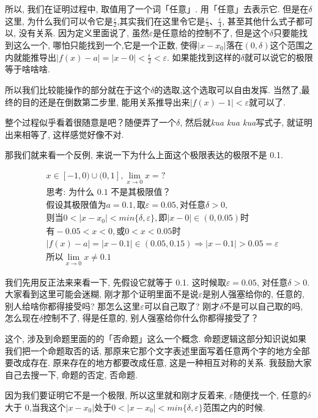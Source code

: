 所以, 我们在证明过程中, 取值用了一个词「任意」.  用「任意」去表示它. 但是在$\delta$这里, 为什么我们可以令它是$\frac{\varepsilon}{2}$,其实我们在这里令它是$\frac{\varepsilon}{3}$、$\frac{\varepsilon}{4}$, 甚至其他什么式子都可以, 没有关系. 因为定义里面说了, 虽然$\varepsilon$是任意给的控制不了, 但是这个$\delta$只要能找到这么一个, 哪怕只能找到一个,它是一个正数, 使得$|x-x_0|$落在$(0,\delta)$这个范围之内就能推导出$|f(x) - a| = |x - 0| < \frac{\varepsilon}{2} < \varepsilon$. 如果能找到这样的$\delta$就可以说它的极限等于啥啥啥. 

所以我们比较能操作的部分就在于这个$\delta$的选取,这个选取可以自由发挥. 当然了,最终的目的还是在倒数第二步里, 能用关系推导出来$|f(x)-1| < \varepsilon$就可以了. 

整个过程似乎看着很随意是吧？随便弄了一个$\delta$, 然后就\textit{kua kua kua}写式子, 就证明出来相等了, 这样感觉好像不对. 

那我们就来看一个反例, 来说一下为什么上面这个极限表达的极限不是 0.1. 

\begin{align*}
  & x \in [-1,0) \cup (0, 1], \lim_{x \to 0} x = ? \\
  & \mbox{思考:  为什么 0.1 不是其极限值？}\\
  & \mbox{假设其极限值为}a = 0.1, \mbox{取} \varepsilon = 0.05, \mbox{对任意}\delta > 0, \\
  & \mbox{则当} 0< |x-x_0| < min\{\delta, \varepsilon \}, \mbox{即}|x-0| \in (0, 0.05)\mbox{时} \\
  & \mbox{有}-0.05 < x < 0, \mbox{或} 0 < x < 0.05 \mbox{时} \\
  & |f(x)-a| = |x-0.1| \in (0.05, 0.15) \Rightarrow |x-0.1| > 0.05 = \varepsilon \\
  & \mbox{所以} \lim_{x \to 0} x \ne 0.1
\end{align*}

我们先用反正法来来看一下, 先假设它就等于 0.1. 这时候取$\varepsilon = 0.05$, 对任意$\delta > 0$. 大家看到这里可能会迷糊, 刚才那个证明里面不是说$\varepsilon$是别人强塞给你的, 任意的, 别人给啥你都得接受吗? 那怎么这里$\varepsilon$可以自己取了? 刚才$\delta$不是可以自己取的吗, 怎么现在$\delta$控制不了, 得是任意的, 别人强塞给你什么你都得接受了？

这个, 涉及到命题里面的的「否命题」这么一个概念. 命题逻辑这部分知识说如果我们把一个命题取否的话, 那原来它那个文字表述里面写着任意两个字的地方全部要改成存在. 原来存在的地方都要改成任意, 这是一种相互对称的关系. 我鼓励大家自己去搜一下, 命题的否定, 否命题. 

因为我们要证明它不是一个极限, 所以这里就和刚才反着来, $\varepsilon$随便找一个, 任意的$\delta$大于 0,当我这个$|x-x_0|$处于$ 0< |x-x_0| < min\{\delta, \varepsilon \}$范围之内的时候. 


